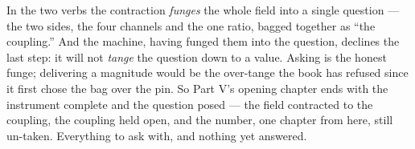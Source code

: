 In the two verbs the contraction \emph{funges} the whole field into a single question --- the two sides, the four
channels and the one ratio, bagged together as ``the coupling.'' And the machine, having funged them into the question,
declines the last step: it will not \emph{tange} the question down to a value. Asking is the honest funge; delivering a
magnitude would be the over-tange the book has refused since it first chose the bag over the pin. So Part V's opening
chapter ends with the instrument complete and the question posed --- the field contracted to the coupling, the coupling
held open, and the number, one chapter from here, still un-taken. Everything to ask with, and nothing yet answered.
